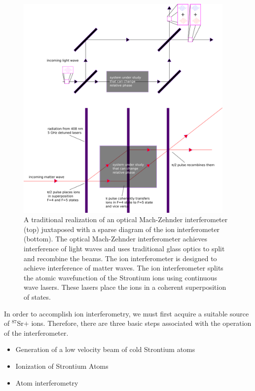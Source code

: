 \begin{figure}
\centerline{
\includegraphics[width=0.95\textwidth]{mach-zehnder}}
\caption[Optical and Matterwave Mach-Zehnder interferometers]{\label{mach-zehnder-fig}A traditional realization of an optical Mach-Zehnder interferometer (top) juxtaposed with a sparse diagram of the ion interferometer (bottom). The optical Mach-Zehnder interferometer achieves interference of light waves and uses traditional glass optics to split and recombine the beams. The ion interferometer is designed to achieve interference of matter waves. The ion interferometer splits the atomic wavefunction of the Strontium ions using continuous wave lasers. These lasers place the ions in a coherent superposition of states.}
\end{figure}

In order to accomplish ion interferometry, we must first acquire a suitable source of $^{87}$Sr$+$ ions. Therefore, there are three basic steps associated with the operation of the interferometer. 
\begin{itemize}
\item Generation of a low velocity beam of cold Strontium atoms   
\item Ionization of Strontium Atoms
\item Atom interferometry
\end{itemize} 

